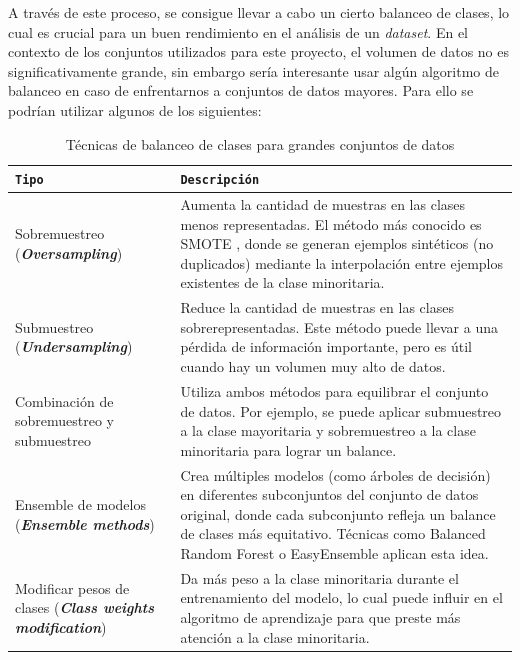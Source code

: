 A través de este proceso, se consigue llevar a cabo un cierto balanceo de clases, lo cual es crucial para un buen rendimiento en el análisis de un \textit{dataset}. En el contexto de los conjuntos utilizados para este proyecto, el volumen de datos no es significativamente grande, sin embargo sería interesante usar algún algoritmo de balanceo \cite{garcia2021comparativa} en caso de enfrentarnos a conjuntos de datos mayores. Para ello se podrían utilizar algunos de los siguientes:

\begin{table}[H]
\centering
\footnotesize
\begin{tabularx}{\linewidth}{|>{\hsize=0.6\hsize}X|>{\hsize=1.4\hsize}X|}
\hline
\rowcolor{graylight}\texttt{Tipo} & \texttt{Descripción} \\
\hline
Sobremuestreo (\textbf{\textit{Oversampling}}) & Aumenta la cantidad de muestras en las clases menos representadas. El método más conocido es \gls{SMOTE} \cite{spositto2020smote}, donde se generan ejemplos sintéticos (no duplicados) mediante la interpolación entre ejemplos existentes de la clase minoritaria. \\
\hline
Submuestreo (\textbf{\textit{Undersampling}}) & Reduce la cantidad de muestras en las clases sobrerepresentadas. Este método puede llevar a una pérdida de información importante, pero es útil cuando hay un volumen muy alto de datos. \\
\hline
Combinación de sobremuestreo y submuestreo & Utiliza ambos métodos para equilibrar el conjunto de datos. Por ejemplo, se puede aplicar submuestreo a la clase mayoritaria y sobremuestreo a la clase minoritaria para lograr un balance. \\
\hline
Ensemble de modelos (\textbf{\textit{Ensemble methods}}) & Crea múltiples modelos (como árboles de decisión) en diferentes subconjuntos del conjunto de datos original, donde cada subconjunto refleja un balance de clases más equitativo. Técnicas como Balanced Random Forest o EasyEnsemble aplican esta idea. \\
\hline
Modificar pesos de clases (\textbf{\textit{Class weights modification}}) & Da más peso a la clase minoritaria durante el entrenamiento del modelo, lo cual puede influir en el algoritmo de aprendizaje para que preste más atención a la clase minoritaria. \\
\hline
\end{tabularx}
\caption{Técnicas de balanceo de clases para grandes conjuntos de datos}
\end{table}


